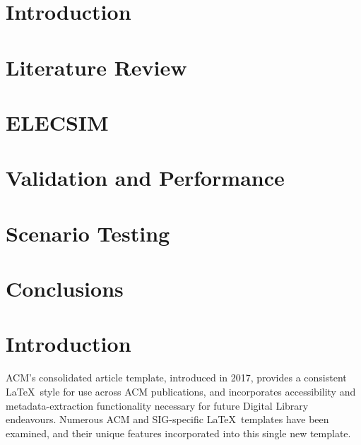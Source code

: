 \documentclass[sigconf]{acmart}
\begin{document}
%

%
\maketitle


\section{Introduction}


\section{Literature Review}\label{Literature Review}

\section{ELECSIM} \label{Model}


\section{Validation and Performance}\label{Valdiation and Performance}


\section{Scenario Testing}\label{Scenario Testing}




\section{Conclusions}\label{Conclusion}




\newpage
\newpage


\section{Introduction}
ACM's consolidated article template, introduced in 2017, provides a consistent \LaTeX\ style for use across ACM publications, and incorporates accessibility and metadata-extraction functionality necessary for future Digital Library endeavours. Numerous ACM and SIG-specific \LaTeX\ templates have been examined, and their unique features incorporated into this single new template.
\end{document}
